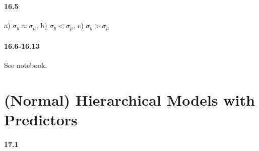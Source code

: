 \documentclass[fontsize=11pt,DIV=18,parskip=half]{scrartcl}
\begin{document}
\paragraph{16.5} a) $\sigma_y \approx \sigma_\mu$, b) $\sigma_y < \sigma_\mu$, c) $\sigma_y > \sigma_\mu$

\paragraph{16.6-16.13} See notebook.

\section{(Normal) Hierarchical Models with Predictors}

\paragraph{17.1}
\end{document}
